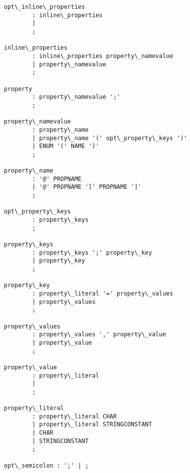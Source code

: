 \begin{Verbatim}[commandchars=\\\{\}]
opt\_inline\_properties
        : inline\_properties
        |
        ;

inline\_properties
        : inline\_properties property\_namevalue
        | property\_namevalue
        ;

property
        : property\_namevalue ';'
        ;

property\_namevalue
        : property\_name
        | property\_name '(' opt\_property\_keys ')'
        | ENUM '(' NAME ')'
        ;

property\_name
        : '@' PROPNAME
        | '@' PROPNAME '[' PROPNAME ']'
        ;

opt\_property\_keys
        : property\_keys
        ;

property\_keys
        : property\_keys ';' property\_key
        | property\_key
        ;

property\_key
        : property\_literal '=' property\_values
        | property\_values
        ;

property\_values
        : property\_values ',' property\_value
        | property\_value
        ;

property\_value
        : property\_literal
        |
        ;

property\_literal
        : property\_literal CHAR
        | property\_literal STRINGCONSTANT
        | CHAR
        | STRINGCONSTANT
        ;

opt\_semicolon : ';' | ;
\end{Verbatim}


